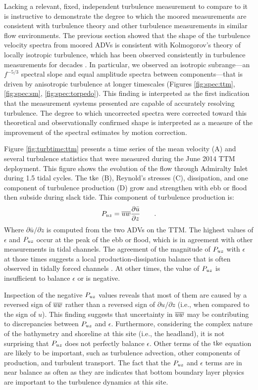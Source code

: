 Lacking a relevant, fixed, independent turbulence measurement to compare to it is instructive to demonstrate the degree to which the moored measurements are consistent with turbulence theory and other turbulence measurements in similar flow environments. The previous section showed that the shape of the turbulence velocity spectra from moored ADVs is consistent with Kolmogorov's theory of locally isotropic turbulence, which has been observed consistently in turbulence measurements for decades \cite[]{Kolmogorov1941c,Grant++1962,McMillan++2016}. In particular, we observed an isotropic subrange---an $f^{-5/3}$ spectral slope and equal amplitude spectra between components---that is driven by anisotropic turbulence at longer timescales (Figures \ref{fig:spec:ttm}, \ref{fig:spec:sm}, \ref{fig:spec:torpedo}). This finding is interpreted as the first indication that the measurement systems presented are capable of accurately resolving turbulence. The degree to which uncorrected spectra were corrected toward this theoretical and observationally confirmed shape is interpreted as a measure of the improvement of the spectral estimates by motion correction.

Figure \ref{fig:turbtime:ttm} presents a time series of the mean velocity (A) and several turbulence statistics that were measured during the June 2014 TTM deployment. This figure shows the evolution of the flow through Admiralty Inlet during 1.5 tidal cycles. The $\mathrm{tke}$ (B), Reynold's stresses (C), dissipation, and one component of turbulence production (D) grow and strengthen with ebb or flood then subside during slack tide.  This component of turbulence production is:
\begin{align}
  P_{uz} = \overline{uw}\frac{\partial \bar{u}}{\partial z} \qquad.
\end{align}
Where $\partial \bar{u}/\partial z$ is computed from the two ADVs on the TTM. The highest values of $\epsilon$ and $P_{uz}$ occur at the peak of the ebb or flood, which is in agreement with other measurements in tidal channels. The agreement of the magnitude of $P_{uz}$ with $\epsilon$ at those times suggests a local production-dissipation balance that is often observed in tidally forced channels \cite[]{Trowbridge++1999,Stacey++1999,McMillan++2016}. At other times, the value of $P_{uz}$ is insufficient to balance $\epsilon$ or is negative. 

Inspection of the negative $P_{uz}$ values reveals that most of them are caused by a reversed sign of $\overline{uw}$ rather than a reversed sign of $\partial u / \partial z$ (i.e., when compared to the sign of $u$). This finding suggests that uncertainty in $\overline{uw}$ may be contributing to discrepancies between $P_{uz}$ and $\epsilon$. Furthermore, considering the complex nature of the bathymetry and shoreline at this site (i.e., the headland), it is not surprising that $P_{uz}$ does not perfectly balance $\epsilon$. Other terms of the $\mathrm{tke}$ equation are likely to be important, such as turbulence advection, other components of production, and turbulent transport. The fact that the $P_{uz}$ and $\epsilon$ terms are in near balance as often as they are indicates that bottom boundary layer physics are important to the turbulence dynamics at this site.

